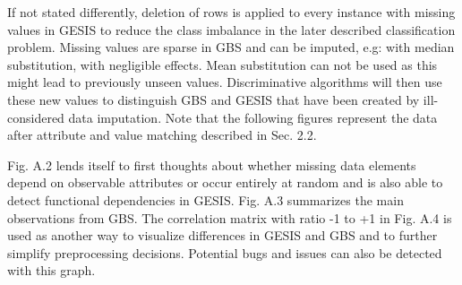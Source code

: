 If not stated differently, deletion of rows is applied to every instance with missing values in GESIS to reduce the class imbalance in the later described classification problem. Missing values are sparse in GBS and can be imputed, e.g: with median substitution, with negligible effects. Mean substitution can not be used as this might lead to previously unseen values. Discriminative algorithms will then use these new values to distinguish GBS and GESIS that have been created by ill-considered data imputation. Note that the following figures represent the data after attribute and value matching described in Sec. 2.2. 

Fig. A.2 lends itself to first thoughts about whether missing data elements depend on observable attributes or occur entirely at random and is also able to detect functional dependencies in GESIS. Fig. A.3 summarizes the main observations from GBS. The correlation matrix with ratio -1 to +1 in Fig. A.4 is used as another way to visualize differences in GESIS and GBS and to further simplify preprocessing decisions. Potential bugs and issues can also be detected with this graph. 

